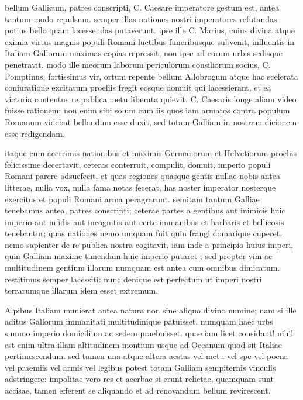  bellum Gallicum, patres conscripti, C. Caesare imperatore gestum est, antea tantum modo repulsum. semper illas nationes nostri imperatores refutandas potius bello quam lacessendas putaverunt. ipse ille C. Marius, cuius divina atque eximia virtus magnis populi Romani luctibus funeribusque subvenit, influentis in Italiam Gallorum maximas copias repressit, non ipse ad eorum urbis sedisque penetravit. modo ille meorum laborum periculorum consiliorum socius, C. Pomptinus, fortissimus vir, ortum repente bellum Allobrogum atque hac scelerata coniuratione excitatum proeliis fregit eosque domuit qui lacessierant, et ea victoria contentus re publica metu liberata quievit. C. Caesaris longe aliam video fuisse rationem; non enim sibi solum cum iis quos iam armatos contra populum Romanum videbat bellandum esse duxit, sed totam Galliam in nostram dicionem esse redigendam.

 itaque cum acerrimis nationibus et maximis Germanorum et Helvetiorum proeliis felicissime decertavit, ceteras conterruit, compulit, domuit, imperio populi Romani parere adsuefecit, et quas regiones quasque gentis nullae nobis antea litterae, nulla vox, nulla fama notas fecerat, has noster imperator nosterque exercitus et populi Romani arma peragrarunt. semitam tantum Galliae tenebamus antea, patres conscripti; ceterae partes a gentibus aut inimicis huic imperio aut infidis aut incognitis aut certe immanibus et barbaris et bellicosis tenebantur; quas nationes nemo umquam fuit quin frangi domarique cuperet. nemo sapienter de re publica nostra cogitavit, iam inde a principio huius imperi, quin Galliam maxime timendam huic imperio putaret ; sed propter vim ac multitudinem gentium illarum numquam est antea cum omnibus dimicatum. restitimus semper lacessiti: nunc denique est perfectum ut imperi nostri terrarumque illarum idem esset extremum.

 Alpibus Italiam munierat antea natura non sine aliquo divino numine; nam si ille aditus Gallorum immanitati multitudinique patuisset, numquam haec urbs summo imperio domicilium ac sedem praebuisset. quae iam licet considant! nihil est enim ultra illam altitudinem montium usque ad Oceanum quod sit Italiae pertimescendum. sed tamen una atque altera aestas vel metu vel spe vel poena vel praemiis vel armis vel legibus potest totam Galliam sempiternis vinculis adstringere: impolitae vero res et acerbae si erunt relictae, quamquam sunt accisae, tamen efferent se aliquando et ad renovandum bellum revirescent.

